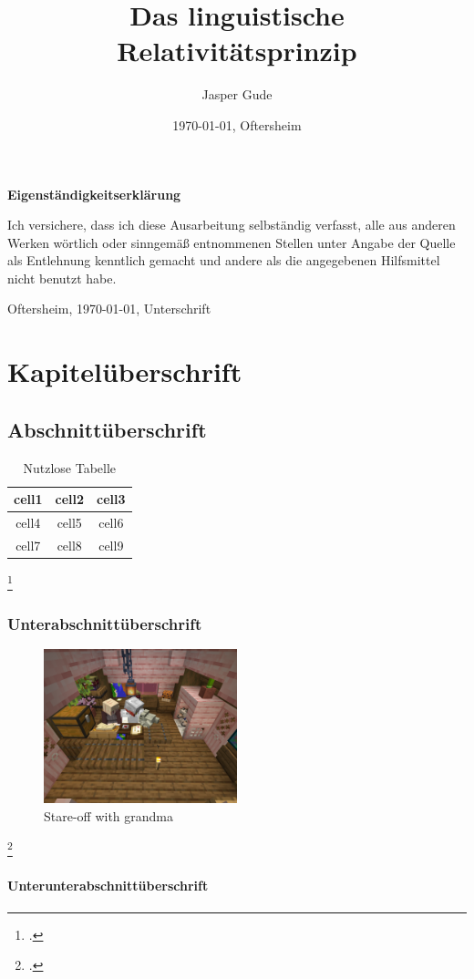 \documentclass[12pt]{scrreprt}
\title{Das linguistische Relativitätsprinzip}
\author{Jasper Gude}
\date{\today{}, Oftersheim}
\begin{document}
\maketitle

\begin{center}
	\bfseries{Eigenständigkeitserklärung}
\end{center}
Ich versichere, dass ich diese Ausarbeitung selbständig verfasst, alle aus anderen Werken
wörtlich oder sinngemäß entnommenen Stellen unter Angabe der Quelle als Entlehnung
kenntlich gemacht und andere als die angegebenen Hilfsmittel nicht benutzt habe.

Oftersheim, \today, Unterschrift

\tableofcontents
\listoffigures
\listoftables

\chapter{Kapitelüberschrift}
	\label{chap:kapitel}

\section{Abschnittüberschrift}
	\label{sec:abschnitt}

\lipsum[2-3]
\autocite[5]{a}

\begin{table}[!htb]
	\centering
	\caption[Nutzlose Tabelle {\autocite[4--5]{a}}]{Nutzlose Tabelle\footnotemark}
	\begin{tabular}{ |c|c|c| }
		\hline
		cell1 & cell2 & cell3 \\
		\hline
		cell4 & cell5 & cell6 \\
		cell7 & cell8 & cell9 \\
		\hline
	\end{tabular}
	\label{tab:useless}
\end{table}
\footcitetext[4--5]{a}

\subsection{Unterabschnittüberschrift}
	\label{sec:unterabschnitt}

\lipsum[1-2]
\autocite[1--5]{b}

\begin{figure}[!htb]
	\centering
	\includegraphics[width=0.5\textwidth]{image}
	\caption[Stare-off with grandma {\autocite[3]{c}}]{Stare-off with grandma\footnotemark}
	\label{fig:granny}
\end{figure}
\footcitetext[3]{a}

\subsubsection{Unterunterabschnittüberschrift}
	\label{sec:unterunterabschnitt}
\autocite[30--58]{c}
\lipsum[1-1]
\autocite[30--58]{c}

\printbibliography
\end{document}
